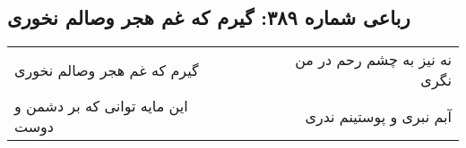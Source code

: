 \begin{center}
\section*{رباعی شماره ۳۸۹: گیرم که غم هجر وصالم نخوری}
\label{sec:sh389}
\begin{longtable}{l p{0.5cm} r}
گیرم که غم هجر وصالم نخوری
&&
نه نیز به چشم رحم در من نگری
\\
این مایه توانی که بر دشمن و دوست
&&
آبم نبری و پوستینم ندری
\\
\end{longtable}
\end{center}
